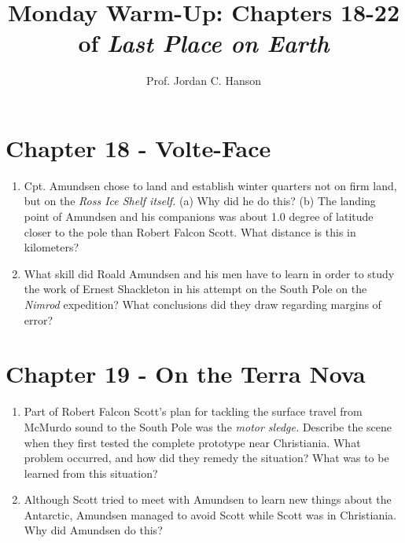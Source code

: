 \documentclass{article}
\begin{document}
\twocolumn

\title{Monday Warm-Up: Chapters 18-22 of \textit{Last Place on Earth}}
\author{Prof. Jordan C. Hanson}

\maketitle

\section{Chapter 18 - Volte-Face}

\begin{enumerate}
\item Cpt. Amundsen chose to land and establish winter quarters not on firm land, but on the \textit{Ross Ice Shelf itself.}  (a) Why did he do this?  (b) The landing point of Amundsen and his companions was about 1.0 degree of latitude closer to the pole than Robert Falcon Scott.  What distance is this in kilometers? \\ \vspace{3cm}
\item What skill did Roald Amundsen and his men have to learn in order to study the work of Ernest Shackleton in his attempt on the South Pole on the \textit{Nimrod} expedition?  What conclusions did they draw regarding margins of error? \\ \vspace{3cm}
\end{enumerate}

\section{Chapter 19 - On the Terra Nova}

\begin{enumerate}
\item Part of Robert Falcon Scott's plan for tackling the surface travel from McMurdo sound to the South Pole was the \textit{motor sledge.}  Describe the scene when they first tested the complete prototype near Christiania.  What problem occurred, and how did they remedy the situation?  What was to be learned from this situation? \\ \vspace{3cm}
\item Although Scott tried to meet with Amundsen to learn new things about the Antarctic, Amundsen managed to avoid Scott while Scott was in Christiania.  Why did Amundsen do this? \\ \vspace{2cm}
\end{enumerate}
\end{document}
